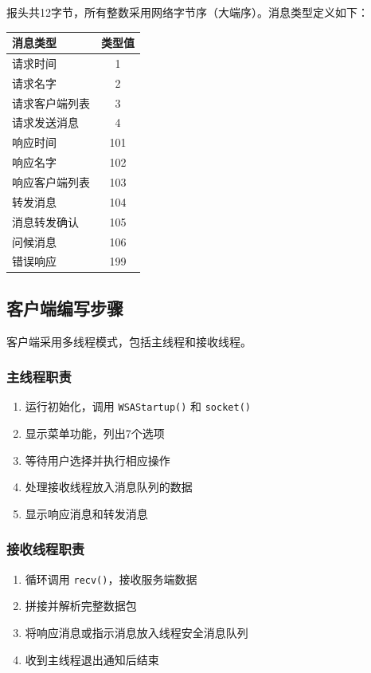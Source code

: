 \documentclass[12pt,a4paper]{article}
\begin{document}
报头共12字节，所有整数采用网络字节序（大端序）。消息类型定义如下：

\begin{center}
\begin{tabular}{|l|c|}
\hline
\textbf{消息类型} & \textbf{类型值} \\
\hline
请求时间 & 1 \\
请求名字 & 2 \\
请求客户端列表 & 3 \\
请求发送消息 & 4 \\
\hline
响应时间 & 101 \\
响应名字 & 102 \\
响应客户端列表 & 103 \\
转发消息 & 104 \\
消息转发确认 & 105 \\
问候消息 & 106 \\
错误响应 & 199 \\
\hline
\end{tabular}
\end{center}

\subsection{客户端编写步骤}

客户端采用多线程模式，包括主线程和接收线程。

\subsubsection{主线程职责}
\begin{enumerate}
    \item 运行初始化，调用 \texttt{WSAStartup()} 和 \texttt{socket()}
    \item 显示菜单功能，列出7个选项
    \item 等待用户选择并执行相应操作
    \item 处理接收线程放入消息队列的数据
    \item 显示响应消息和转发消息
\end{enumerate}

\subsubsection{接收线程职责}
\begin{enumerate}
    \item 循环调用 \texttt{recv()}，接收服务端数据
    \item 拼接并解析完整数据包
    \item 将响应消息或指示消息放入线程安全消息队列
    \item 收到主线程退出通知后结束
\end{enumerate}
\end{document}
